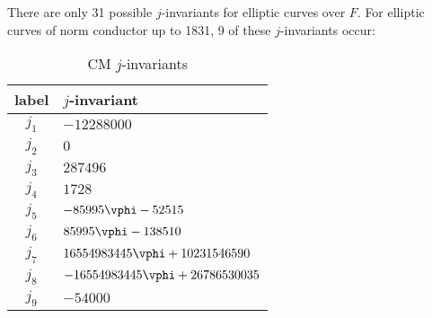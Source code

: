 \documentclass{amsart}
\begin{document}
There are only 31 possible $j$-invariants for elliptic curves over $F$.  
For elliptic curves of norm conductor up to 1831, 9 of these $j$-invariants occur:

\begin{center}
\begin{table}[h]
\caption{CM $j$-invariants\label{table:CM-j-invariants}}
\begin{tabular}{|c|l|}\hline
\textbf{label} & \textbf{$j$-invariant} \\\hline
$j_1$ & $-12288000$ \\\hline
$j_2$ & $0$ \\\hline
$j_3$ & $ 287496$ \\\hline
$j_4$ & $1728$ \\\hline
$j_5$ & $-85995\vphi - 52515$ \\\hline
$j_6$ & $85995\vphi - 138510$ \\\hline
$j_7$ & $16554983445\vphi + 10231546590$ \\\hline
$j_8$ & $-16554983445\vphi + 26786530035$ \\\hline
$j_9$ & $-54000$ \\\hline
\end{tabular}
\end{table}
\end{center}
\end{document}
